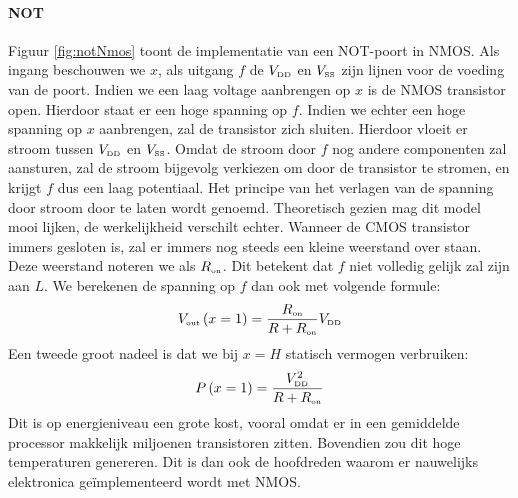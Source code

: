 \paragraph{NOT} Figuur \ref{fig:notNmos} toont de implementatie van een NOT-poort in NMOS. Als ingang beschouwen we $x$, als uitgang $f$ de $V_{\mbox{\tiny DD}}$ en $V_{\mbox{\tiny SS}}$ zijn lijnen voor de voeding van de poort. Indien we een laag voltage aanbrengen op $x$ is de NMOS transistor open. Hierdoor staat er een hoge spanning op $f$. Indien we echter een hoge spanning op $x$ aanbrengen, zal de transistor zich sluiten. Hierdoor vloeit er stroom tussen $V_{\mbox{\tiny DD}}$ en $V_{\mbox{\tiny SS}}$. Omdat de stroom door $f$ nog andere componenten zal aansturen, zal de stroom bijgevolg verkiezen om door de transistor te stromen, en krijgt $f$ dus een laag potentiaal. Het principe van het verlagen van de spanning door stroom door te laten wordt  genoemd. Theoretisch gezien mag dit model mooi lijken, de werkelijkheid verschilt echter. Wanneer de CMOS transistor immers gesloten is, zal er immers nog steeds een kleine weerstand over staan. Deze weerstand noteren we als $R_{\mbox{\tiny on}}$. Dit betekent dat $f$ niet volledig gelijk zal zijn aan $L$. We berekenen de spanning op $f$ dan ook met volgende formule:
\begin{equation}
V_{\mbox{\tiny out}}\left(x=1\right)=\displaystyle\frac{R_{\mbox{\tiny on}}}{R+R_{\mbox{\tiny on}}}V_{\mbox{\tiny DD}}
\end{equation}
Een tweede groot nadeel is dat we bij $x=H$ statisch vermogen verbruiken:
\begin{equation}
P\left(x=1\right)=\displaystyle\frac{V_{\mbox{\tiny DD}}^2}{R+R_{\mbox{\tiny on}}}
\end{equation}
Dit is op energieniveau een grote kost, vooral omdat er in een gemiddelde processor makkelijk miljoenen transistoren zitten. Bovendien zou dit hoge temperaturen genereren. Dit is dan ook de hoofdreden waarom er nauwelijks elektronica ge\"implementeerd wordt met NMOS.
